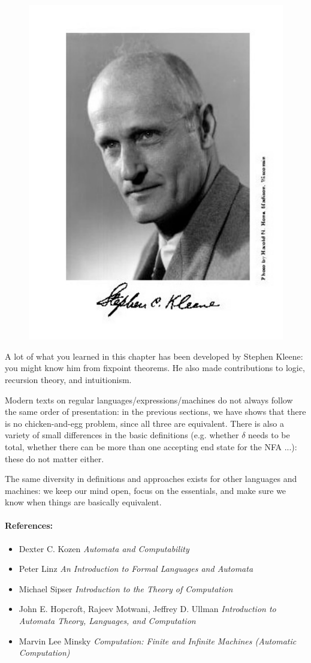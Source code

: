 \setlength{\intextsep}{0pt}
\begin{figure}
\includegraphics[width=.19\textwidth,keepaspectratio]{afbeeldingen/kleene}
\end{figure}


A lot of what you learned in this chapter has been developed by
Stephen Kleene: you might know him from fixpoint theorems. He also made contributions to logic, recursion theory, and intuitionism.

Modern texts on regular languages/expressions/machines do not always
follow the same order of presentation: in the previous sections, we
have shows that there is no chicken-and-egg problem, since all three
are equivalent. There is also a variety of small differences in the
basic definitions (e.g. whether $\delta$ needs to be total, whether
there can be more than one accepting end state for the NFA ...): these
do not matter either.

The same diversity in definitions and approaches exists for other
languages and machines: we keep our mind open, focus on the
essentials, and make sure we know when things are basically
equivalent.



\paragraph{References:}

\begin{itemize}
\item
Dexter C. Kozen  {\em Automata and Computability}

\item
Peter Linz {\em An Introduction to Formal Languages and Automata}

\item
Michael Sipser {\em Introduction to the Theory of Computation}

\item
John E. Hopcroft, Rajeev Motwani, Jeffrey D. Ullman
{\em Introduction to Automata Theory, Languages, and Computation}

\item
Marvin Lee Minsky {\em Computation: Finite and Infinite Machines
(Automatic Computation)}
\end{itemize}

